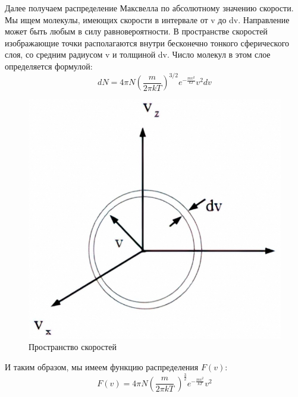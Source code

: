 \documentclass[a4paper,12pt]{article}
\begin{document}
Далее получаем распределение Максвелла по абсолютному значению скорости. Мы ищем молекулы, имеющих скорости в интервале от v до dv. Направление может быть любым в силу равновероятности. В пространстве скоростей изображающие точки располагаются внутри бесконечно тонкого сферического слоя, со средним радиусом v и толщиной dv. Число молекул в этом слое определяется формулой:
\begin{equation}
dN=4\pi N{\left(\frac{m}{2\pi kT} \right) }^{3/2}e^{-\frac{mv^2}{kT}}v^2dv
\end{equation}
\begin{figure}[h!]
	\begin{center}
		\includegraphics[scale=0.33]{1}
	\end{center}
	\caption{Пространство скоростей}
\end{figure}	

И таким образом, мы имеем функцию распределения $F(v)$:
\begin{equation}
F\left(v\right)=4\pi N{\left(\frac{m}{2\pi kT}\ \right) }^\frac{3}{2}e^{-\frac{mv^2}{kT}}v^2
\end{equation}
\end{document}
